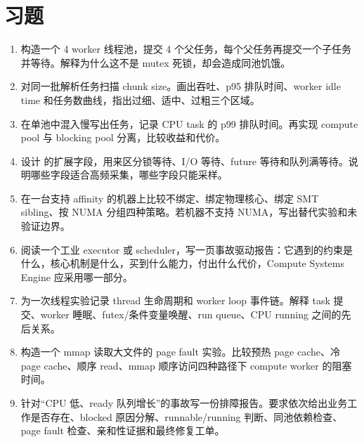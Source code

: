 \section{习题}

\begin{exercisebox}
\begin{enumerate}
  \item 构造一个 4 worker 线程池，提交 4 个父任务，每个父任务再提交一个子任务并等待。解释为什么这不是 mutex 死锁，却会造成同池饥饿。
  \item 对同一批解析任务扫描 chunk size。画出吞吐、p95 排队时间、worker idle time 和任务数曲线，指出过细、适中、过粗三个区域。
  \item 在单池中混入慢写出任务，记录 CPU task 的 p99 排队时间。再实现 compute pool 与 blocking pool 分离，比较收益和代价。
  \item 设计  的扩展字段，用来区分锁等待、I/O 等待、future 等待和队列满等待。说明哪些字段适合高频采集，哪些字段只能采样。
  \item 在一台支持 affinity 的机器上比较不绑定、绑定物理核心、绑定 SMT sibling、按 NUMA 分组四种策略。若机器不支持 NUMA，写出替代实验和未验证边界。
  \item 阅读一个工业 executor 或 scheduler，写一页事故驱动报告：它遇到的约束是什么，核心机制是什么，买到什么能力，付出什么代价，Compute Systems Engine 应采用哪一部分。
  \item 为一次线程实验记录 thread 生命周期和 worker loop 事件链。解释 task 提交、worker 睡眠、futex/条件变量唤醒、run queue、CPU running 之间的先后关系。
  \item 构造一个 mmap 读取大文件的 page fault 实验。比较预热 page cache、冷 page cache、顺序 read、mmap 顺序访问四种路径下 compute worker 的阻塞时间。
  \item 针对“CPU 低、ready 队列增长”的事故写一份排障报告。要求依次给出业务工作是否存在、blocked 原因分解、runnable/running 判断、同池依赖检查、page fault 检查、亲和性证据和最终修复工单。
\end{enumerate}
\end{exercisebox}
